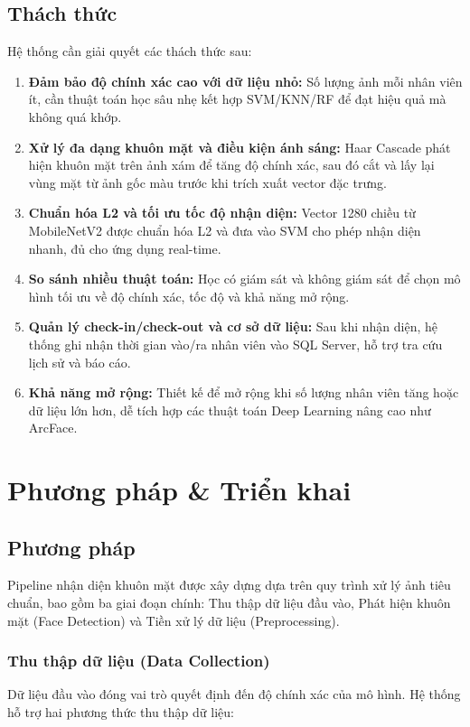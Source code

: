 \documentclass[a4paper]{book}
\begin{document}
\section{Thách thức}
Hệ thống cần giải quyết các thách thức sau:
\begin{enumerate}
    \item \textbf{Đảm bảo độ chính xác cao với dữ liệu nhỏ:} Số lượng ảnh mỗi nhân viên ít, cần thuật toán học sâu nhẹ kết hợp SVM/KNN/RF để đạt hiệu quả mà không quá khớp.
    \item \textbf{Xử lý đa dạng khuôn mặt và điều kiện ánh sáng:} Haar Cascade phát hiện khuôn mặt trên ảnh xám để tăng độ chính xác, sau đó cắt và lấy lại vùng mặt từ ảnh gốc màu trước khi trích xuất vector đặc trưng.
    \item \textbf{Chuẩn hóa L2 và tối ưu tốc độ nhận diện:} Vector 1280 chiều từ MobileNetV2 được chuẩn hóa L2 và đưa vào SVM cho phép nhận diện nhanh, đủ cho ứng dụng real-time.
    \item \textbf{So sánh nhiều thuật toán:} Học có giám sát và không giám sát để chọn mô hình tối ưu về độ chính xác, tốc độ và khả năng mở rộng.
    \item \textbf{Quản lý check-in/check-out và cơ sở dữ liệu:} Sau khi nhận diện, hệ thống ghi nhận thời gian vào/ra nhân viên vào SQL Server, hỗ trợ tra cứu lịch sử và báo cáo.
    \item \textbf{Khả năng mở rộng:} Thiết kế để mở rộng khi số lượng nhân viên tăng hoặc dữ liệu lớn hơn, dễ tích hợp các thuật toán Deep Learning nâng cao như ArcFace.
\end{enumerate}


\chapter{Phương pháp \& Triển khai}

\section{Phương pháp}
Pipeline nhận diện khuôn mặt được xây dựng dựa trên quy trình xử lý ảnh tiêu chuẩn, bao gồm ba giai đoạn chính: Thu thập dữ liệu đầu vào, Phát hiện khuôn mặt (Face Detection) và Tiền xử lý dữ liệu (Preprocessing).

\subsection{Thu thập dữ liệu (Data Collection)}
Dữ liệu đầu vào đóng vai trò quyết định đến độ chính xác của mô hình. Hệ thống hỗ trợ hai phương thức thu thập dữ liệu:
\end{document}
